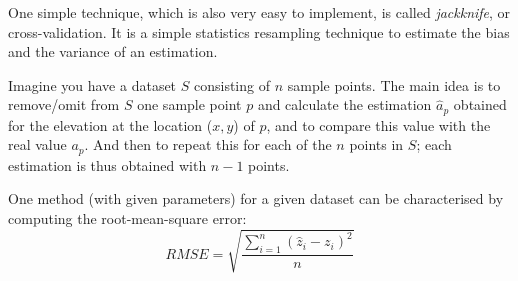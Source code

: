 One simple technique, which is also very easy to implement, is called \emph{jackknife}, or  cross-validation.%
It is a simple statistics resampling technique to estimate the bias and the variance of an estimation.

Imagine you have a dataset $S$ consisting of $n$ sample points.
The main idea is to remove/omit from $S$ one sample point $p$ and calculate the estimation $\hat{a}_p$  obtained for the elevation at the location ($x,y$) of $p$, and to compare this value with the real value $a_p$.
And then to repeat this for each of the $n$ points in $S$; each estimation is thus obtained with $n-1$ points.

One method (with given parameters) for a given dataset can be characterised by computing the root-mean-square error:%
\begin{equation}
  RMSE = \sqrt{\frac{\sum_{i=1}^{n}(\hat{z}_i - z_i)^2}{n}}
\end{equation}

